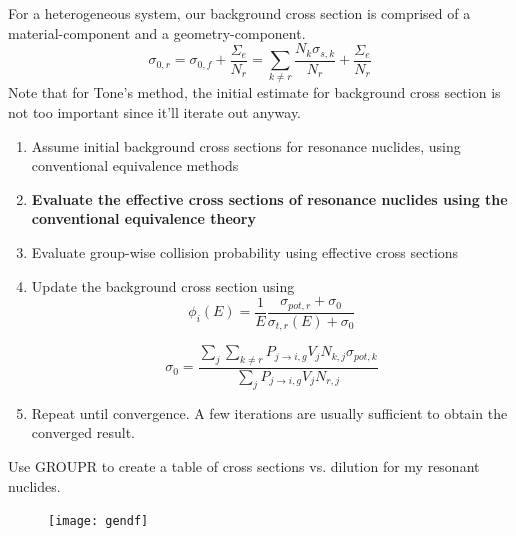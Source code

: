 \documentclass{beamer}
\begin{document}
\begin{frame}
  For a heterogeneous system, our background cross section is comprised of a material-component and a geometry-component.
  \[\sigma_{0,r}=\sigma_{0,f}+\frac{\Sigma_e}{N_r}=\sum_{k\neq r}\frac{N_k\sigma_{s,k}}{N_r}+\frac{\Sigma_e}{N_r}\]
Note that for Tone's method, the initial estimate for background cross section is not too important since it'll iterate out anyway.
\end{frame}

    \begin{frame}
      \begin{enumerate}
        \item Assume initial background cross sections for resonance nuclides, using conventional equivalence methods
        \item \textbf{Evaluate the effective cross sections of resonance nuclides using the conventional equivalence theory}
        \item Evaluate group-wise collision probability using effective cross sections 
        \item Update the background cross section using
\begin{equation*}\phi_i(E)=\frac{1}{E}\frac{\sigma_{pot,r}+\sigma_{0}}{\sigma_{t,r}(E)+\sigma_{0}}\end{equation*}

\begin{equation*}\sigma_{0}=\frac{\sum\limits_j\sum\limits_{k\neq r}P_{j\rightarrow i,g}V_{j}N_{k,j}\sigma_{pot,k}}{\sum\limits_jP_{j\rightarrow i,g}V_{j}N_{r,j}}\end{equation*}


        \item Repeat until convergence. A few iterations are usually sufficient to obtain the converged result.
      \end{enumerate}
\end{frame}



\begin{frame}
  Use GROUPR to create a table of cross sections vs. dilution for my resonant nuclides.
\begin{figure}

\texttt{[image: gendf]}
\end{figure}


\end{frame}
\end{document}
